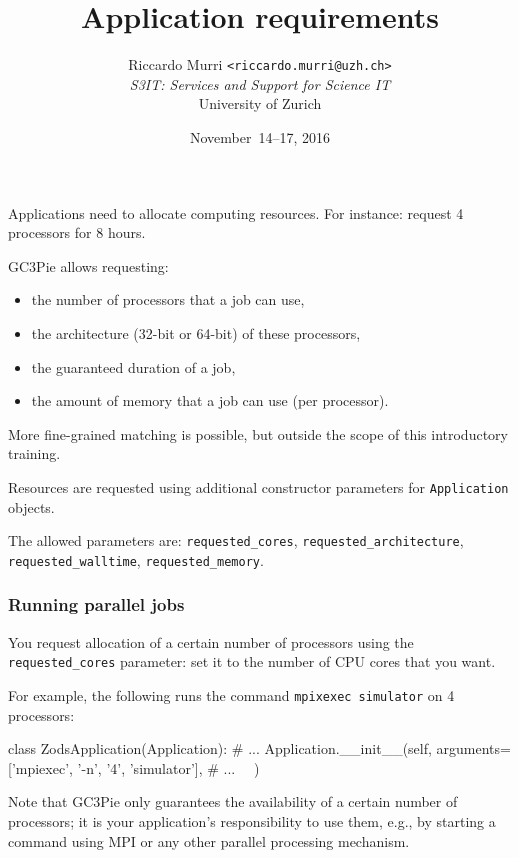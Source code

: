 \documentclass[english,serif,mathserif,xcolor=pdftex,dvipsnames,table]{beamer}
\title[Requirements]{%
  Application requirements
}
\author[R. Murri, S3IT UZH]{%
  Riccardo Murri \texttt{<riccardo.murri@uzh.ch>}
  \\[1ex]
  \emph{S3IT: Services and Support for Science IT}
  \\[1ex]
  University of Zurich
}
\date{November~14--17, 2016}
\begin{document}
\maketitle


\begin{frame}
  Applications need to allocate computing resources.
  For instance: request 4 processors for 8 hours.

  \+
  GC3Pie allows requesting:
  \begin{itemize}
  \item the number of processors that a job can use,
  \item the architecture (32-bit or 64-bit) of these processors,
  \item the guaranteed duration of a job,
  \item the amount of memory that a job can use (per processor).
  \end{itemize}

  \+
  More fine-grained matching is possible, but outside the scope of
  this introductory training.
\end{frame}


\begin{frame}[fragile]
  Resources are requested using additional constructor parameters for
  \texttt{Application} objects.

  \+
  The allowed parameters are:
  \lstinline|requested_cores|,
  \lstinline|requested_architecture|,
  \lstinline|requested_walltime|,
  \lstinline|requested_memory|.
\end{frame}


\begin{frame}[fragile]
  \frametitle{Running parallel jobs}

  You request allocation of a certain number of processors using the
  \lstinline|requested_cores| parameter: set it to the number of CPU
  cores that you want.

  \+
  For example, the following runs the command \texttt{mpixexec
    simulator} on 4 processors:
  \begin{python}
  class ZodsApplication(Application):
    # ...
    Application.__init__(self,
      arguments=['mpiexec', '-n', '4', 'simulator'],
      # ...
      ~~)
  \end{python}

  \+
  {\small Note that GC3Pie only guarantees the availability of a certain
    number of processors; it is your application's responsibility to use
    them, e.g., by starting a command using MPI or any other parallel
    processing mechanism.}
\end{frame}
\end{document}

